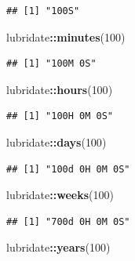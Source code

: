 \documentclass[
]{article}
\newenvironment{Shaded}{\begin{snugshade}}{\end{snugshade}}
\newcommand{\DecValTok}[1]{\textcolor[rgb]{0.00,0.00,0.81}{#1}}
\newcommand{\FunctionTok}[1]{\textcolor[rgb]{0.13,0.29,0.53}{\textbf{#1}}}
\newcommand{\NormalTok}[1]{#1}
\newcommand{\SpecialCharTok}[1]{\textcolor[rgb]{0.81,0.36,0.00}{\textbf{#1}}}
\begin{document}
\begin{verbatim}
## [1] "100S"
\end{verbatim}

\begin{Shaded}
\begin{Highlighting}[]
\NormalTok{lubridate}\SpecialCharTok{::}\FunctionTok{minutes}\NormalTok{(}\DecValTok{100}\NormalTok{)}
\end{Highlighting}
\end{Shaded}

\begin{verbatim}
## [1] "100M 0S"
\end{verbatim}

\begin{Shaded}
\begin{Highlighting}[]
\NormalTok{lubridate}\SpecialCharTok{::}\FunctionTok{hours}\NormalTok{(}\DecValTok{100}\NormalTok{)}
\end{Highlighting}
\end{Shaded}

\begin{verbatim}
## [1] "100H 0M 0S"
\end{verbatim}

\begin{Shaded}
\begin{Highlighting}[]
\NormalTok{lubridate}\SpecialCharTok{::}\FunctionTok{days}\NormalTok{(}\DecValTok{100}\NormalTok{)}
\end{Highlighting}
\end{Shaded}

\begin{verbatim}
## [1] "100d 0H 0M 0S"
\end{verbatim}

\begin{Shaded}
\begin{Highlighting}[]
\NormalTok{lubridate}\SpecialCharTok{::}\FunctionTok{weeks}\NormalTok{(}\DecValTok{100}\NormalTok{)}
\end{Highlighting}
\end{Shaded}

\begin{verbatim}
## [1] "700d 0H 0M 0S"
\end{verbatim}

\begin{Shaded}
\begin{Highlighting}[]
\NormalTok{lubridate}\SpecialCharTok{::}\FunctionTok{years}\NormalTok{(}\DecValTok{100}\NormalTok{)}
\end{Highlighting}
\end{Shaded}
\end{document}
